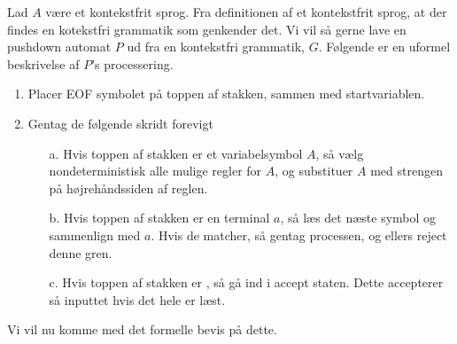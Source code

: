 Lad $A$ være et kontekstfrit sprog. Fra definitionen af et kontekstfrit sprog, at der findes en kotekstfri grammatik som genkender det. Vi vil så gerne lave en pushdown automat $P$ ud fra en kontekstfri grammatik, $G$. Følgende er en uformel beskrivelse af $P$'s processering.
\begin{enumerate}
  \item Placer EOF symbolet \textdollar på toppen af stakken, sammen med startvariablen.
  \item Gentag de følgende skridt forevigt
        \begin{enumerate}
          \item[a.] Hvis toppen af stakken er et variabelsymbol $A$, så vælg nondeterministisk alle mulige regler for $A$, og substituer $A$ med strengen på højrehåndssiden af reglen.
          \item[b.] Hvis toppen af stakken er en terminal $a$, så læs det næste symbol og sammenlign med $a$. Hvis de matcher, så gentag processen, og ellers reject denne gren.
          \item[c.] Hvis toppen af stakken er \textdollar, så gå ind i accept staten. Dette accepterer så inputtet hvis det hele er læst.
        \end{enumerate}
\end{enumerate}

Vi vil nu komme med det formelle bevis på dette.

